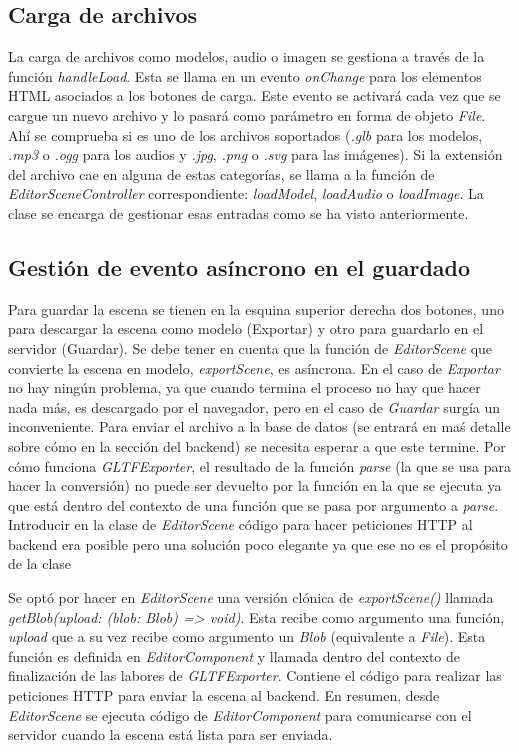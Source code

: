 \subsection{Carga de archivos}

La carga de archivos como modelos, audio o imagen se gestiona a través de la función \textit{handleLoad}. Esta se llama en un evento \textit{onChange} para los elementos HTML asociados a los botones de carga. Este evento se activará cada vez que se cargue un nuevo archivo y lo pasará como parámetro en forma de objeto \textit{File}. Ahí se comprueba si es uno de los archivos soportados (\textit{.glb} para los modelos, \textit{.mp3} o \textit{.ogg} para los audios y \textit{.jpg}, \textit{.png} o \textit{.svg} para las imágenes). Si la extensión del archivo cae en alguna de estas categorías, se llama a la función de \textit{EditorSceneController} correspondiente: \textit{loadModel}, \textit{loadAudio} o \textit{loadImage}. La clase se encarga de gestionar esas entradas como se ha visto anteriormente.

\subsection{Gestión de evento asíncrono en el guardado}

Para guardar la escena se tienen en la esquina superior derecha dos botones, uno para descargar la escena como modelo (Exportar) y otro para guardarlo en el servidor (Guardar). Se debe tener en cuenta que la función de \textit{EditorScene} que convierte la escena en modelo, \textit{exportScene}, es asíncrona. En el caso de \textit{Exportar} no hay ningún problema, ya que cuando termina el proceso no hay que hacer nada más, es descargado por el navegador, pero en el caso de \textit{Guardar} surgía un inconveniente. Para enviar el archivo a la base de datos (se entrará en maś detalle sobre cómo en la sección del backend) se necesita esperar a que este termine. Por cómo funciona \textit{GLTFExporter}, el resultado de la función \textit{parse} (la que se usa para hacer la conversión) no puede ser devuelto por la función en la que se ejecuta ya que está dentro del contexto de una función que se pasa por argumento a \textit{parse}. Introducir en la clase de \textit{EditorScene} código para hacer peticiones HTTP al backend era posible pero una solución poco elegante ya que ese no es el propósito de la clase

Se optó por hacer en \textit{EditorScene} una versión clónica de \textit{exportScene()} llamada \textit{getBlob(upload: (blob: Blob) => void)}. Esta recibe como argumento una función, \textit{upload} que a su vez recibe como argumento un \textit{Blob} (equivalente a \textit{File}). Esta función es definida en \textit{EditorComponent} y llamada dentro del contexto de finalización de las labores de \textit{GLTFExporter}. Contiene el código para realizar las peticiones HTTP para enviar la escena al backend. En resumen, desde \textit{EditorScene} se ejecuta código de \textit{EditorComponent} para comunicarse con el servidor cuando la escena está lista para ser enviada.

